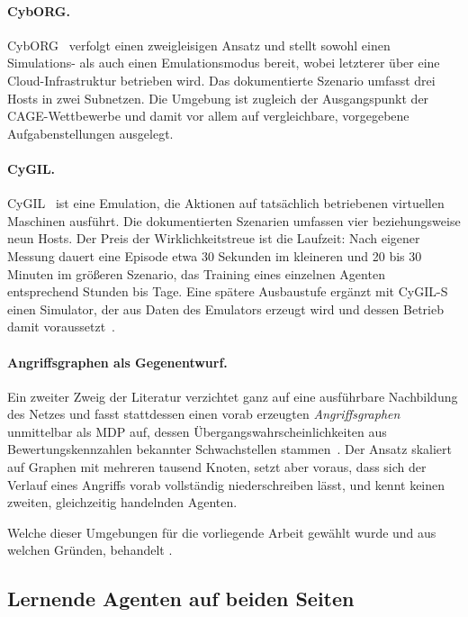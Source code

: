 \paragraph{CybORG.}
CybORG~\cite{standen2021cyborg} verfolgt einen zweigleisigen Ansatz und stellt
sowohl einen Simulations- als auch einen Emulationsmodus bereit, wobei letzterer
über eine Cloud-Infrastruktur betrieben wird. Das dokumentierte Szenario umfasst
drei Hosts in zwei Subnetzen. Die Umgebung ist zugleich der Ausgangspunkt der
CAGE-Wettbewerbe und damit vor allem auf vergleichbare, vorgegebene
Aufgabenstellungen ausgelegt.

\paragraph{CyGIL.}
CyGIL~\cite{li2021cygil} ist eine Emulation, die Aktionen auf tatsächlich
betriebenen virtuellen Maschinen ausführt. Die dokumentierten Szenarien umfassen
vier beziehungsweise neun Hosts. Der Preis der Wirklichkeitstreue ist die
Laufzeit: Nach eigener Messung dauert eine Episode etwa 30 Sekunden im kleineren
und 20 bis 30 Minuten im größeren Szenario, das Training eines einzelnen Agenten
entsprechend Stunden bis Tage. Eine spätere Ausbaustufe ergänzt mit CyGIL-S
einen Simulator, der aus Daten des Emulators erzeugt wird und dessen Betrieb
damit voraussetzt~\cite{li2023cygilsim}.

\paragraph{Angriffsgraphen als Gegenentwurf.}
Ein zweiter Zweig der Literatur verzichtet ganz auf eine ausführbare
Nachbildung des Netzes und fasst stattdessen einen vorab erzeugten
\emph{Angriffsgraphen} unmittelbar als \ac{MDP} auf, dessen
Übergangswahrscheinlichkeiten aus Bewertungskennzahlen bekannter Schwachstellen
stammen~\cite[Abschn.~II.C]{gangupantulu2021cja}. Der Ansatz skaliert auf
Graphen mit mehreren tausend Knoten, setzt aber voraus, dass sich der Verlauf
eines Angriffs vorab vollständig niederschreiben lässt, und kennt keinen
zweiten, gleichzeitig handelnden Agenten.

Welche dieser Umgebungen für die vorliegende Arbeit gewählt wurde und aus
welchen Gründen, behandelt .

\subsection{Lernende Agenten auf beiden Seiten}
\label{sec:beidseitig}

